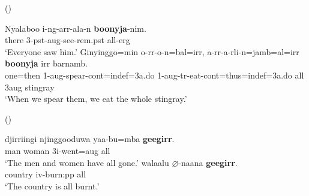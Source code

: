 \documentclass{article}
\begin{document}
\begin{exe}
   (\citealt[272]{bowern12})
  \begin{xlist}
    \ex \gll Nyalaboo i-ng-arr-ala-n \textbf{boonyja}-nim.\\
    there 3-{\sc pst}-{\sc aug}-see-{\sc rem.pst} all-{\sc erg}\\
    \glt `Everyone saw him.' \label{univ1}%
    \ex \gll Ginyinggo=min o-rr-o-n=bal=irr, a-rr-a-rli-n=jamb=al=irr \textbf{boonyja} irr barnamb.\\
    one={\sc then} 1-{\sc aug}-spear-{\sc cont}={\sc indef}=3{\sc a.do} 1-{\sc aug}-{\sc tr}-eat-{\sc cont}={\sc thus}={\sc indef}=3{\sc a.do} all 3{\sc aug} stingray\\
    \glt `When we spear them, we eat the whole stingray.' \label{univ2} %
  \end{xlist}
   (\citealt[307]{harvey92})
  \begin{xlist}
    \ex \gll djirriingi njinggooduwa yaa-bu=mba \textbf{geegirr}.\\
    man woman 3{\sc i}-went={\sc aug} all\\
    \glt `The men and women have all gone.'
    \ex \gll walaalu $\varnothing$-naana \textbf{geegirr}.\\
    country {\sc iv}-burn:{\sc pp} all\\
    \glt `The country is all burnt.'
  \end{xlist}
\end{exe}
\end{document}
